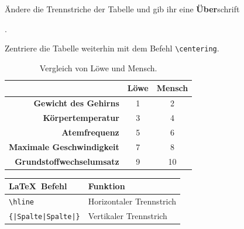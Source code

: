 \documentclass["WS\space 16-17\space -\space LaTeX-Kurs\space -\space Praesentation\space -\space 2.tex"]{subfiles}
\begin{document}
\begin{frame}[fragile]
	\Aufgabee
		Ändere die Trennstriche der Tabelle und gib ihr eine \textbf{Über}schrift
        
        \textrm{}.
        
        Zentriere die Tabelle weiterhin mit dem Befehl \lstinline[basicstyle=\normalfont\normalsize]|\centering|.
	\begin{outputbox}
		\vspace{-0.4cm}
		\begin{center}
            \begin{table}[htbp]
                \centering
            	\caption{Vergleich von Löwe und Mensch.}
                \vspace{-0.4cm}
            	\begin{tabular}{r|cc}
            		\hline 
            		\textbf{} & \textbf{Löwe} & \textbf{Mensch} \\ \hline  
            		\textbf{Gewicht des Gehirns} & 1 & 2 \\  
            		\textbf{Körpertemperatur} & 3 & 4 \\  
            		\textbf{Atemfrequenz} & 5 & 6 \\ 
            		\textbf{Maximale Geschwindigkeit} & 7 & 8 \\  
            		\textbf{Grundstoffwechselumsatz} & 9 & 10 \\ \hline
            	\end{tabular} 
            	\label{}
            \end{table}
		\end{center}
		\vspace{-0.2cm}
	\end{outputbox}
	
	\btVFill\Befehle
	\begin{center}
		\begin{tabular}{ll}
			\toprule
			\LaTeX\ Befehl								&	Funktion								\\ \midrule
			\lstinline|\hline|							&	Horizontaler Trennstrich				\\
			\lstinline/{|Spalte|Spalte|}/				&	Vertikaler Trennstrich    				\\
			\bottomrule
		\end{tabular}
	\end{center}
	\vspace{0.1cm}
\end{frame}
\end{document}
